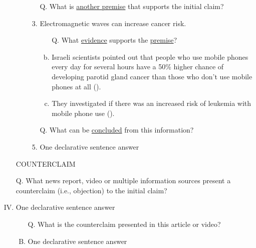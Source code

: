 \documentclass[a4paper, 12pt]{article}
\begin{document}
\begin{CJK*}{UTF8}{bsmi}
\begin{enumerate}[I.]
\begin{enumerate}[A.]
\begin{enumerate}[1.]
\begin{enumerate}[a.]
                                  \end{enumerate}
                            \item [Q.] What is \underline{another premise} that supports the {\color{blue}initial claim}?
                            \item Electromagnetic waves can increase cancer risk.
                                  \begin{enumerate}[a.]
                                      \item [Q.] What \underline{evidence} supports the \underline{premise}?
                                      \item Israeli scientists pointed out that people who use mobile phones every day for
                                            several hours have a 50\% higher chance of developing parotid gland cancer than
                                            those who don't use mobile phones at all (\cite{epaper9706,10.1093/aje/kwm325}).
                                      \item They investigated if there was an increased risk of leukemia with mobile phone use (\cite{16094}).
                                  \end{enumerate}
                            \item [Q.] What can be \underline{concluded} from this information?
                            \item {\color{gray} One declarative sentence answer} %
                        \end{enumerate}
              \end{enumerate}
        \item [] {\color{red}COUNTERCLAIM}
        \item [Q.] What news report, video or multiple information sources present a {\color{red} counterclaim} (i.e., objection) to
              the {\color{blue} initial claim}?
        \item {\color{gray} One declarative sentence answer} %
              \begin{enumerate}[A.]
                  \item [Q.] What is the {\color{red} counterclaim} presented in this article or video?
                  \item {\color{gray} One declarative sentence answer} %

\end{enumerate}
\end{enumerate}
\end{CJK*}
\end{document}
